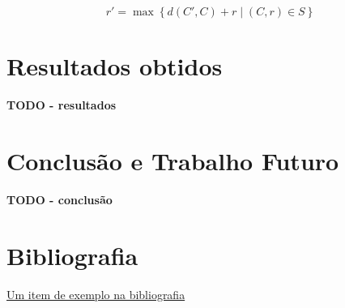 \documentclass[12pt, a4paper]{article}
\begin{document}
$$
r' = \max \left \lbrace d(C', C) + r \mid (C, r) \in S \right \rbrace
$$

\section{Resultados obtidos}

\textbf{\color{red} TODO - resultados}

\section{Conclusão e Trabalho Futuro}

\textbf{\color{red} TODO - conclusão}

\begingroup
\section{Bibliografia}
\renewcommand{\section}[2]{}

\begin{thebibliography}{9}
        \href{https://youtu.be/dQw4w9WgXcQ}{Um item de exemplo na bibliografia}
\end{thebibliography}
\endgroup
\end{document}
